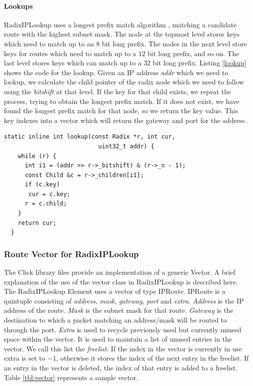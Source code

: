 \documentclass[a4paper]{article}
\begin{document}
\paragraph{Lookups}
RadixIPLookup uses a longest prefix match algorithm \cite{rfc2461}, matching a candidate route with the highest subnet mask. The node at the topmost level stores keys which need to match up to an 8 bit long prefix. The nodes in the next level store keys for routes which need to match up to a $12$ bit long prefix, and so on. The last level stores keys which can match up to a $32$ bit long prefix. Listing \ref{lookup} shows the code for the lookup. Given an IP address \emph{addr} which we need to lookup, we calculate the child pointer of the radix node which we need to follow using the \emph{bitshift} at that level. If the key for that child exists, we repeat the process, trying to obtain the longest prefix match. If it does not exist, we have found the longest prefix match for that node, so we return the key value. This key indexes into a vector which will return the gateway and port for the address.
\begin{lstlisting}[caption = The lookup function, label=lookup]
  static inline int lookup(const Radix *r, int cur, 
                           uint32_t addr) {
    while (r) {
      int i1 = (addr >> r->_bitshift) & (r->_n - 1);
      const Child &c = r->_children[i1];
      if (c.key)
       cur = c.key;
      r = c.child;
    }
    return cur;
  }
\end{lstlisting}
\subsubsection{Route Vector for RadixIPLookup}
The Click library files provide an implementation of a generic Vector. A brief explanation of the use of the vector class in RadixIPLookup is described here. The RadixIPLookup Element uses a vector of type IPRoute. IPRoute is a quintuple consisting of \emph{address}, \emph{mask}, \emph{gateway}, \emph{port} and \emph{extra}. \emph{Address} is the IP address of the route. \emph{Mask} is the subnet mask for that route. \emph{Gateway} is the destination to which a packet matching an address/mask will be routed to through the port. \emph{Extra} is used to recycle previously used but currently unused space within the vector. It is used to maintain a list of unused entries in the vector. We call this list the \emph{freelist}. If the index in the vector is currently in use extra is set to $-1$, otherwise it stores the index of the next entry in the freelist. If an entry in the vector is deleted, the index of that entry is added to a freelist. Table \ref{tbl:vector} represents a sample vector.
\end{document}
